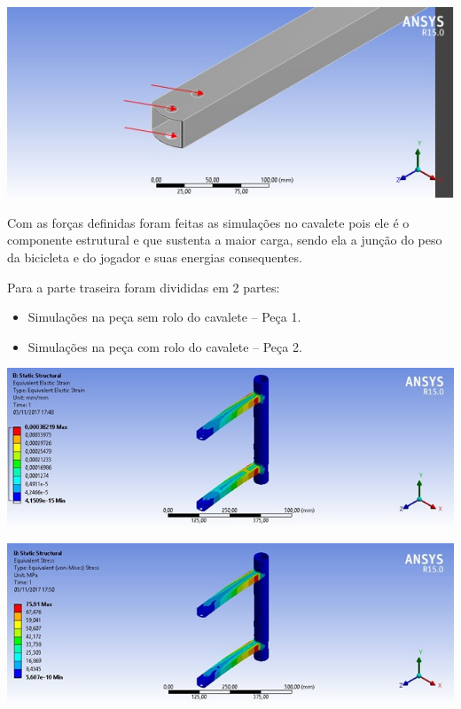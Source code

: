     
    \begin{center}
    	\includegraphics[scale=0.7]{figuras/forcas_2}
        \label{forcas_2}
    \end{center}  
 
    Com as forças definidas foram feitas as simulações no cavalete pois ele é o componente estrutural e que sustenta a maior carga, sendo ela a junção do peso da bicicleta e do jogador e suas energias consequentes.
 
    Para a parte traseira foram divididas em 2 partes:
    \begin{itemize}
        \item Simulações na peça sem rolo do cavalete – Peça 1.
        \item Simulações na peça com rolo do cavalete – Peça 2.
    \end{itemize}
 
    \begin{center}
    	\includegraphics[scale=0.7]{figuras/sim_estatica_3}
        \label{sim_estatica_3}
    \end{center}
    
    \begin{center}
    	\includegraphics[scale=0.7]{figuras/stress_3}
        \label{stress_3}
    \end{center}
    
